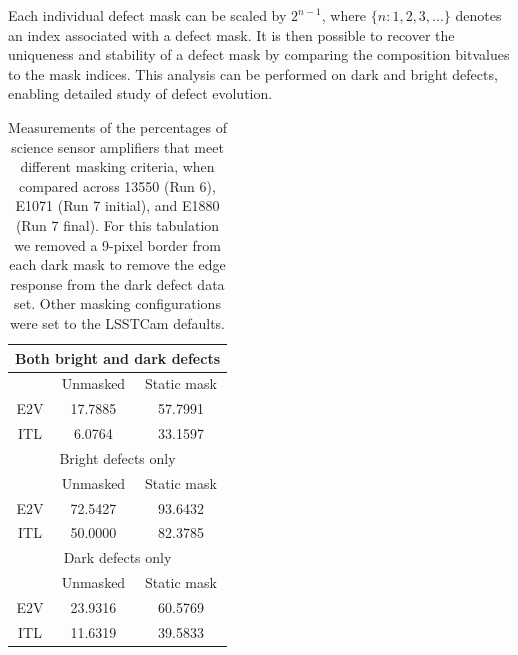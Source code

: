 
Each individual defect mask can be scaled by $2^{n-1}$, where $\{n:1,2,3,... \}$ denotes an index associated with a defect mask. It is then possible to recover the uniqueness and stability of a defect mask by comparing the composition bitvalues to the mask indices. This analysis can be performed on dark and bright defects, enabling detailed study of defect evolution. 

\begin{table}[ht]\label{table:defectStability:measurements}
\centering
\begin{tabular}{|ccc|}
\hline
\multicolumn{3}{|c|}{Both bright and dark defects}                      \\ \hline
\multicolumn{1}{|c|}{}    & \multicolumn{1}{c|}{Unmasked} & Static mask \\ \hline
\multicolumn{1}{|c|}{E2V} & \multicolumn{1}{c|}{17.7885}  & 57.7991     \\ \hline
\multicolumn{1}{|c|}{ITL} & \multicolumn{1}{c|}{6.0764}   & 33.1597     \\ \hline
\multicolumn{3}{|c|}{Bright defects only}                               \\ \hline
\multicolumn{1}{|c|}{}    & \multicolumn{1}{c|}{Unmasked} & Static mask \\ \hline
\multicolumn{1}{|c|}{E2V} & \multicolumn{1}{c|}{72.5427}  & 93.6432     \\ \hline
\multicolumn{1}{|c|}{ITL} & \multicolumn{1}{c|}{50.0000}  & 82.3785     \\ \hline
\multicolumn{3}{|c|}{Dark defects only}                                 \\ \hline
\multicolumn{1}{|c|}{}    & \multicolumn{1}{c|}{Unmasked} & Static mask \\ \hline
\multicolumn{1}{|c|}{E2V} & \multicolumn{1}{c|}{23.9316}  & 60.5769     \\ \hline
\multicolumn{1}{|c|}{ITL} & \multicolumn{1}{c|}{11.6319}  & 39.5833     \\ \hline
\end{tabular}
\caption{Measurements of the percentages of science sensor amplifiers that meet different masking criteria, when compared across 13550 (Run 6), E1071 (Run 7 initial), and E1880 (Run 7 final). For this tabulation we removed a 9-pixel border from each dark mask to remove the edge response from the dark defect data set. Other masking configurations were set to the LSSTCam defaults.}
\end{table}

